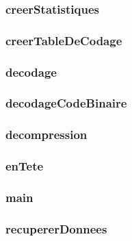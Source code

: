  \subsubsection{creerStatistiques}
 

 \subsubsection{creerTableDeCodage}
 

 \subsubsection{decodage}
 

 \subsubsection{decodageCodeBinaire}
 

 \subsubsection{decompression}
 

 \subsubsection{enTete}
 

 \subsubsection{main}
 

 \subsubsection{recupererDonnees}
 

